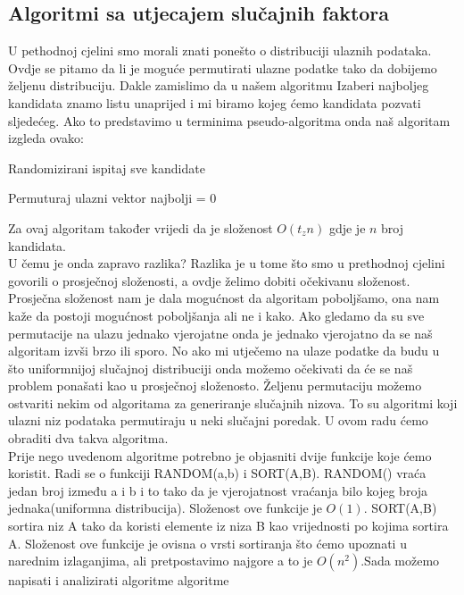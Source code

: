 \documentclass[10pt,a4paper]{article}
\begin{document}
\subsection{Algoritmi sa utjecajem slučajnih faktora}
U pethodnoj cjelini smo morali znati ponešto o distribuciji ulaznih podataka. Ovdje se pitamo da li je moguće permutirati ulazne podatke tako da 
dobijemo željenu distribuciju. Dakle zamislimo da u našem algoritmu Izaberi najboljeg kandidata znamo listu unaprijed i mi biramo kojeg ćemo kandidata pozvati sljedećeg.
Ako to predstavimo u terminima pseudo-algoritma onda naš algoritam izgleda ovako:
\begin{center}
\begin{algorithm}[H]
\caption{Randomizirani ispitaj sve kandidate}
Permuturaj ulazni vektor\;
najbolji = 0\;
\end{algorithm}
\end{center}
Za ovaj algoritam također vrijedi da je složenost $O(t_zn)$ gdje je $n$ broj kandidata.\\
U čemu je onda zapravo razlika? Razlika je u tome što smo u prethodnoj cjelini govorili o prosječnoj složenosti, a ovdje želimo dobiti očekivanu složenost.
Prosječna složenost nam je dala mogućnost da algoritam poboljšamo, ona nam kaže da postoji mogućnost poboljšanja ali ne i kako. Ako gledamo da su sve permutacije 
na ulazu jednako vjerojatne onda je jednako vjerojatno da se naš algoritam izvši brzo ili sporo. No ako mi utječemo na ulaze podatke da budu u što uniformnijoj slučajnoj
distribuciji onda možemo očekivati da će se naš problem ponašati kao u prosječnoj složenosto. Željenu permutaciju možemo ostvariti nekim od algoritama za generiranje slučajnih nizova. To su algoritmi koji ulazni niz podataka permutiraju u neki slučajni poredak.
U ovom radu ćemo obraditi dva takva algoritma.\\
Prije nego uvedenom algoritme potrebno je objasniti dvije funkcije koje ćemo koristit. Radi se o funkciji RANDOM(a,b) i SORT(A,B). RANDOM() vraća jedan broj između a i b i to tako da je vjerojatnost vraćanja bilo kojeg broja jednaka(uniformna distribucija). Složenost ove funkcije je $O(1)$. SORT(A,B) sortira niz A tako da koristi elemente iz niza B kao vrijednosti po kojima sortira A. Složenost ove funkcije je ovisna o vrsti sortiranja što ćemo upoznati u narednim izlaganjima, ali pretpostavimo najgore a to je $O(n^2)$.Sada možemo napisati i analizirati algoritme algoritme
\end{document}
